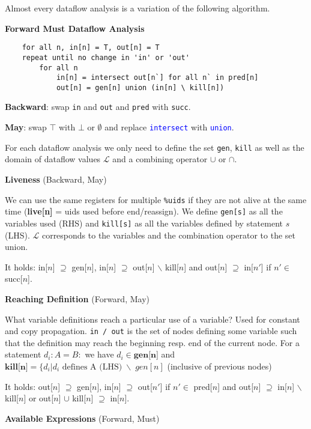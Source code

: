 Almost every dataflow analysis is a variation of the following algorithm.\smallskip

\textbf{Forward Must Dataflow Analysis}
\begin{lstlisting}
	for all n, in[n] = T, out[n] = T
	repeat until no change in 'in' or 'out'
		for all n
			in[n] = intersect out[n`] for all n` in pred[n]
			out[n] = gen[n] union (in[n] \ kill[n])	
\end{lstlisting}
\textbf{Backward}: swap \texttt{in} and \texttt{out} and \texttt{pred} with \texttt{succ}.

\textbf{May}: swap $\top$ with $\bot$ or $\emptyset$ and replace \textcolor{blue}{\texttt{intersect}} with \textcolor{blue}{\texttt{union}}.\medskip

For each dataflow analysis we only need to define the set \texttt{gen}, \texttt{kill} as well as the domain of dataflow values $\mathcal L$ and a combining operator $\cup$ or $\cap$.\medskip

\textbf{Liveness} (Backward, May)\medskip

We can use the same registers for multiple \texttt{\%uids} if they are not alive at the same time
(\textbf{live[n]} = uids used before end/reassign).
We define \texttt{gen[s]} as all the variables used (RHS) and \texttt{kill[s]} as all the variables defined by statement $s$ (LHS). $\mathcal L$ corresponds to the variables and the combination operator to the set union.\medskip

It holds: in[$n$] $\supseteq$ gen[$n$], in[$n$] $\supseteq$ out[$n$] $\backslash$ kill[$n$] and out[$n$] $\supseteq$ in[$n'$] if $n' \in $ succ[$n$].\medskip

\textbf{Reaching Definition} (Forward, May)\medskip

What variable definitions reach a particular use of a variable? Used for constant and copy propagation.
\texttt{in / out} is the set of nodes defining some variable such that the definition may reach the beginning resp.
end of the current node. For a statement $d_i: A=B:$ we have $d_i \in \textbf{gen[n]}$ and $\textbf{kill[n]}=\{d_i | \text{$d_i$ defines A (LHS)} \;\backslash\; gen[n]$ (inclusive of previous nodes) \medskip

It holds: out[$n$] $\supseteq$ gen[$n$], in[$n$] $\supseteq$ out[$n'$] if $n' \in$ pred[$n$] and out[$n$] $\supseteq$ in[$n$] $\backslash$ kill[$n$] or out[$n$] $\cup$ kill[$n$] $\supseteq$ in[$n$].\medskip

\textbf{Available Expressions} (Forward, Must)\medskip

